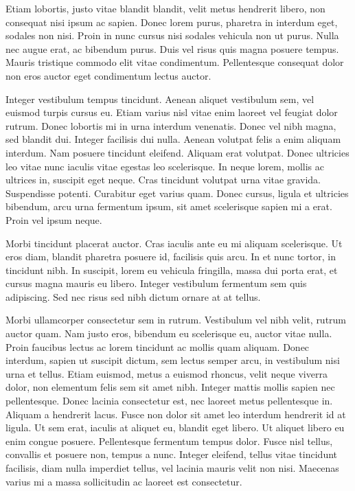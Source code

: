 \documentclass[a4paper]{article}
\begin{document}
Etiam lobortis, justo vitae blandit blandit, velit metus hendrerit libero, non consequat nisi ipsum ac sapien. Donec lorem purus, pharetra in interdum eget, sodales non nisi. Proin in nunc cursus nisi sodales vehicula non ut purus. Nulla nec augue erat, ac bibendum purus. Duis vel risus quis magna posuere tempus. Mauris tristique commodo elit vitae condimentum. Pellentesque consequat dolor non eros auctor eget condimentum lectus auctor.

Integer vestibulum tempus tincidunt. Aenean aliquet vestibulum sem, vel euismod turpis cursus eu. Etiam varius nisl vitae enim laoreet vel feugiat dolor rutrum. Donec lobortis mi in urna interdum venenatis. Donec vel nibh magna, sed blandit dui. Integer facilisis dui nulla. Aenean volutpat felis a enim aliquam interdum. Nam posuere tincidunt eleifend. Aliquam erat volutpat. Donec ultricies leo vitae nunc iaculis vitae egestas leo scelerisque. In neque lorem, mollis ac ultrices in, suscipit eget neque. Cras tincidunt volutpat urna vitae gravida. Suspendisse potenti. Curabitur eget varius quam. Donec cursus, ligula et ultricies bibendum, arcu urna fermentum ipsum, sit amet scelerisque sapien mi a erat. Proin vel ipsum neque.

Morbi tincidunt placerat auctor. Cras iaculis ante eu mi aliquam scelerisque. Ut eros diam, blandit pharetra posuere id, facilisis quis arcu. In et nunc tortor, in tincidunt nibh. In suscipit, lorem eu vehicula fringilla, massa dui porta erat, et cursus magna mauris eu libero. Integer vestibulum fermentum sem quis adipiscing. Sed nec risus sed nibh dictum ornare at at tellus.

Morbi ullamcorper consectetur sem in rutrum. Vestibulum vel nibh velit, rutrum auctor quam. Nam justo eros, bibendum eu scelerisque eu, auctor vitae nulla. Proin faucibus lectus ac lorem tincidunt ac mollis quam aliquam. Donec interdum, sapien ut suscipit dictum, sem lectus semper arcu, in vestibulum nisi urna et tellus. Etiam euismod, metus a euismod rhoncus, velit neque viverra dolor, non elementum felis sem sit amet nibh. Integer mattis mollis sapien nec pellentesque. Donec lacinia consectetur est, nec laoreet metus pellentesque in. Aliquam a hendrerit lacus. Fusce non dolor sit amet leo interdum hendrerit id at ligula. Ut sem erat, iaculis at aliquet eu, blandit eget libero. Ut aliquet libero eu enim congue posuere. Pellentesque fermentum tempus dolor. Fusce nisl tellus, convallis et posuere non, tempus a nunc. Integer eleifend, tellus vitae tincidunt facilisis, diam nulla imperdiet tellus, vel lacinia mauris velit non nisi. Maecenas varius mi a massa sollicitudin ac laoreet est consectetur.
\end{document}
